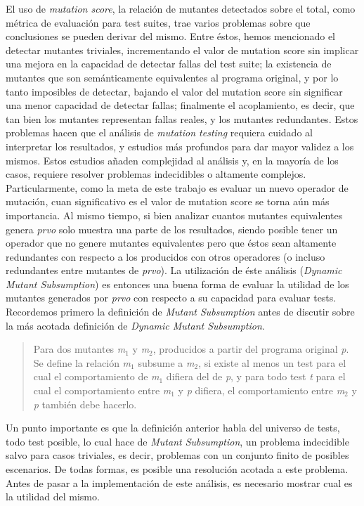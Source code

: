 El uso de \emph{mutation score}, la relaci\'on de mutantes detectados sobre el total, como m\'etrica de evaluaci\'on para test suites, trae varios problemas sobre que conclusiones se pueden derivar del mismo. Entre \'estos, hemos mencionado el detectar mutantes triviales, incrementando el valor de mutation score sin implicar una mejora en la capacidad de detectar fallas del test suite; la existencia de mutantes que son sem\'anticamente equivalentes al programa original, y por lo tanto imposibles de detectar, bajando el valor del mutation score sin significar una menor capacidad de detectar fallas; finalmente el acoplamiento, es decir, que tan bien los mutantes representan fallas reales, y los mutantes redundantes. Estos problemas hacen que el an\'alisis de \emph{mutation testing} requiera cuidado al interpretar los resultados, y estudios m\'as profundos para dar mayor validez a los mismos. Estos estudios a\~naden complejidad al an\'alisis y, en la mayor\'ia de los casos, requiere resolver problemas indecidibles o altamente complejos. Particularmente, como la meta de este trabajo es evaluar un nuevo operador de mutaci\'on, cuan significativo es el valor de mutation score se torna a\'un m\'as importancia. Al mismo tiempo, si bien analizar cuantos mutantes equivalentes genera \emph{prvo} solo muestra una parte de los resultados, siendo posible tener un operador que no genere mutantes equivalentes pero que \'estos sean altamente redundantes con respecto a los producidos con otros operadores (o incluso redundantes entre mutantes de \emph{prvo}). La utilizaci\'on de \'este an\'alisis (\emph{Dynamic Mutant Subsumption}) es entonces una buena forma de evaluar la utilidad de los mutantes generados por \emph{prvo} con respecto a su capacidad para evaluar tests.
Recordemos primero la definici\'on de \emph{Mutant Subsumption} antes de discutir sobre la m\'as acotada definici\'on de \emph{Dynamic Mutant Subsumption}.
\begin{quote}
	Para dos mutantes \emph{m$_1$} y \emph{m$_2$}, producidos a partir del programa original \emph{p}. Se define la relaci\'on \emph{m$_1$} subsume a \emph{m$_2$}, si existe al menos un test para el cual el comportamiento de \emph{m$_1$} difiera del de \emph{p}, y para todo test \emph{t} para el cual el comportamiento entre \emph{m$_1$} y \emph{p} difiera, el comportamiento entre \emph{m$_2$} y \emph{p} tambi\'en debe hacerlo.
\end{quote}
Un punto importante es que la definici\'on anterior habla del universo de tests, todo test posible, lo cual hace de \emph{Mutant Subsumption}, un problema indecidible salvo para casos triviales, es decir, problemas con un conjunto finito de posibles escenarios. De todas formas, es posible una resoluci\'on acotada a este problema. Antes de pasar a la implementaci\'on de este an\'alisis, es necesario mostrar cual es la utilidad del mismo.
